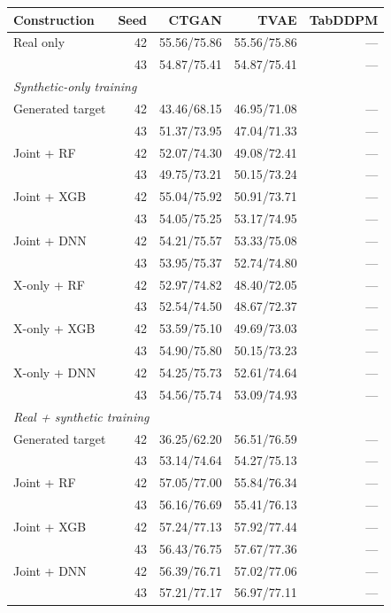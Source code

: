 \begin{table}[ht]
\centering
{\small
\setlength{\tabcolsep}{2pt}
\begin{tabular}{lrrrr}
\toprule
Construction & Seed & CTGAN & TVAE & TabDDPM \\
\midrule
Real only & 42 & 55.56/75.86 & 55.56/75.86 & --- \\
 & 43 & 54.87/75.41 & 54.87/75.41 & --- \\
\midrule
\multicolumn{5}{l}{\textit{Synthetic-only training}} \\
Generated target & 42 & 43.46/68.15 & 46.95/71.08 & --- \\
 & 43 & 51.37/73.95 & 47.04/71.33 & --- \\
Joint + RF & 42 & 52.07/74.30 & 49.08/72.41 & --- \\
 & 43 & 49.75/73.21 & 50.15/73.24 & --- \\
Joint + XGB & 42 & 55.04/75.92 & 50.91/73.71 & --- \\
 & 43 & 54.05/75.25 & 53.17/74.95 & --- \\
Joint + DNN & 42 & 54.21/75.57 & 53.33/75.08 & --- \\
 & 43 & 53.95/75.37 & 52.74/74.80 & --- \\
X-only + RF & 42 & 52.97/74.82 & 48.40/72.05 & --- \\
 & 43 & 52.54/74.50 & 48.67/72.37 & --- \\
X-only + XGB & 42 & 53.59/75.10 & 49.69/73.03 & --- \\
 & 43 & 54.90/75.80 & 50.15/73.23 & --- \\
X-only + DNN & 42 & 54.25/75.73 & 52.61/74.64 & --- \\
 & 43 & 54.56/75.74 & 53.09/74.93 & --- \\
\midrule
\multicolumn{5}{l}{\textit{Real + synthetic training}} \\
Generated target & 42 & 36.25/62.20 & 56.51/76.59 & --- \\
 & 43 & 53.14/74.64 & 54.27/75.13 & --- \\
Joint + RF & 42 & 57.05/77.00 & 55.84/76.34 & --- \\
 & 43 & 56.16/76.69 & 55.41/76.13 & --- \\
Joint + XGB & 42 & 57.24/77.13 & 57.92/77.44 & --- \\
 & 43 & 56.43/76.75 & 57.67/77.36 & --- \\
Joint + DNN & 42 & 56.39/76.71 & 57.02/77.06 & --- \\
 & 43 & 57.21/77.17 & 56.97/77.11 & --- \\

\end{tabular}}
\end{table}

